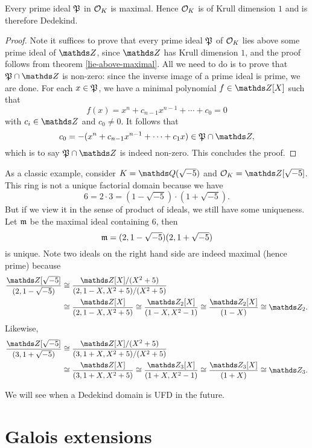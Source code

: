			\begin{theorem}\label{o_k-dedekind}
				Every prime ideal $\mathfrak{P}$ in $\mathcal{O}_K$ is maximal. Hence $\mathcal{O}_K$ is of Krull dimension $1$ and is therefore Dedekind.
			\end{theorem}
			
			\begin{proof}
				Note it suffices to prove that every prime ideal $\mathfrak{P}$ of $\mathcal{O}_K$ lies above some prime ideal of $\Z$, since $\Z$ has Krull dimension $1$, and the proof follows from theorem \ref{lie-above-maximal}. All we need to do is to prove that $\mfk{P} \cap \Z$ is non-zero: since the inverse image of a prime ideal is prime, we are done. For each $x \in \mathfrak{P}$, we have a minimal polynomial $f \in \Z[X]$ such that
				\[
				f(x) = x^n+c_{n-1}x^{n-1}+\cdots+c_0=0
				\]
				with $c_i \in \Z$ and $c_0 \ne 0$. It follows that
				\[
				c_0=-(x^n+c_{n-1}x^{n-1}+\cdots+c_1x) \in \mfk{P} \cap \Z,
				\]
				which is to say $\mfk{P} \cap \Z$ is indeed non-zero. This concludes the proof.
			\end{proof}
			\begin{example}
				As a classic example, consider $K=\Q(\sqrt{-5})$ and $\OK = \Z[\sqrt{-5}]$. This ring is not a unique factorial domain because we have
				\[
				6 = 2 \cdot 3 = (1-\sqrt{-5}) \cdot (1+\sqrt{-5}).
				\]
				But if we view it in the sense of product of ideals, we still have some uniqueness. Let $\mathfrak{m}$ be the maximal ideal containing $6$, then
				\[
				\mathfrak{m} = (2,1-\sqrt{-5})(2,1+\sqrt{-5})
				\]
				is unique. Note two ideals on the right hand side are indeed maximal (hence prime) because
				\[
				\begin{aligned}
					\frac{\Z[\sqrt{-5}]}{(2,1-\sqrt{-5})} &\cong \frac{\Z[X]/(X^2+5)}{(2,1-X,X^2+5)/(X^2+5)} \\
					&\cong \frac{\Z[X]}{(2,1-X,X^2+5)} \cong \frac{\Z_2[X]}{(1-X,X^2-1)} \cong \frac{\Z_2[X]}{(1-X)} \cong \Z_2.
				\end{aligned}
				\]
				Likewise,
				\[
				\begin{aligned}
					\frac{\Z[\sqrt{-5}]}{(3,1+\sqrt{-5})} &\cong \frac{\Z[X]/(X^2+5)}{(3,1+X,X^2+5)/(X^2+5)} \\
					&\cong \frac{\Z[X]}{(3,1+X,X^2+5)} \cong \frac{\Z_3[X]}{(1+X,X^2-1)} \cong \frac{\Z_3[X]}{(1+X)} \cong \Z_3.
				\end{aligned}
				\]
			\end{example}
			We will see when a Dedekind domain is UFD in the future.
	\section{Galois extensions}
